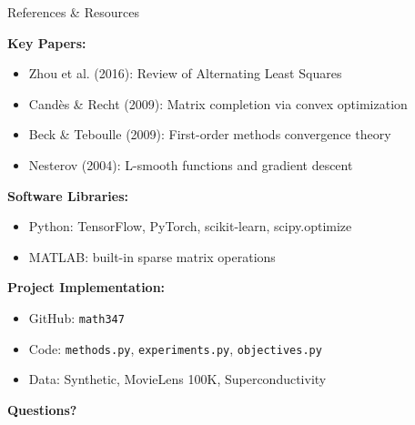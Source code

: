 \documentclass[aspectratio=169,usenames,dvipsnames]{beamer}
\begin{document}
\begin{frame}{References \& Resources}

\textbf{Key Papers:}
\begin{itemize}
  \item Zhou et al. (2016): Review of Alternating Least Squares
  \item Candès \& Recht (2009): Matrix completion via convex optimization
  \item Beck \& Teboulle (2009): First-order methods convergence theory
  \item Nesterov (2004): L-smooth functions and gradient descent
\end{itemize}

\vspace{0.3cm}

\textbf{Software Libraries:}
\begin{itemize}
  \item Python: TensorFlow, PyTorch, scikit-learn, scipy.optimize
  \item MATLAB: built-in sparse matrix operations
\end{itemize}

\vspace{0.3cm}

\textbf{Project Implementation:}
\begin{itemize}
  \item GitHub: \texttt{math347}
  \item Code: \texttt{methods.py}, \texttt{experiments.py}, \texttt{objectives.py}
  \item Data: Synthetic, MovieLens 100K, Superconductivity
\end{itemize}

\vspace{0.5cm}

\centering
\Large \textbf{Questions?}

\end{frame}

\appendix
\end{document}
